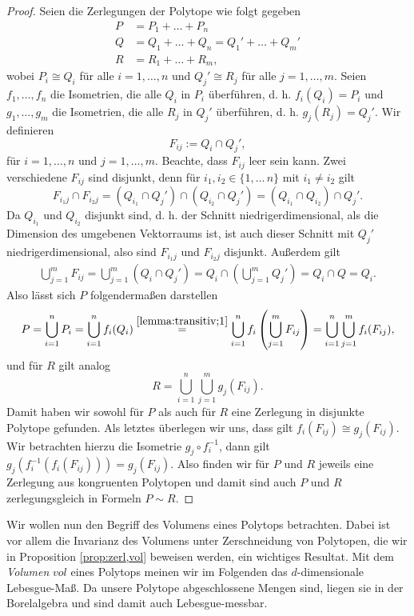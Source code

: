 \documentclass[11pt,titlepage]{article}
\theoremstyle{definition}
\theoremstyle{remark}
\begin{document}
	\begin{proof}
		Seien die Zerlegungen der Polytope wie folgt gegeben
		\begin{align*}
		P &= P_1+\ldots+P_n \\
		Q &= Q_1+\ldots+Q_n = Q_1'+\ldots+Q_m' \\
		R &= R_1+\ldots+R_m,
		\end{align*}
		wobei $P_i\cong Q_i$ für alle $i=1,\ldots,n$ und $Q_j'\cong R_j$ für alle $j=1,\ldots,m$. 
		Seien $f_1,\ldots,f_n$ die Isometrien, die alle $Q_i$ in $P_i$ überführen, 
		d. h. $f_i(Q_i)=P_i$ und 
		$g_1,\ldots,g_m$ die Isometrien, die alle $R_j$ in $Q_j'$ überführen, d. h. $g_j(R_j)=Q_j'$.
		Wir definieren
		\[ F_{ij}:=Q_i\cap Q_j',\]
		für $i=1,\ldots,n$ und $j=1,\ldots,m$. Beachte, dass $F_{ij}$ leer sein kann. Zwei verschiedene 
		$F_{ij}$ sind disjunkt, denn für $i_1,i_2\in\{1,\ldots\,n\}$ mit $i_1\neq i_2$ gilt 
		\[F_{i_1 j}\cap F_{i_2 j}=(Q_{i_1}\cap Q_j')\cap(Q_{i_2}\cap Q_j')=(Q_{i_1}\cap Q_{i_2})\cap Q_j'.\] 
		Da $Q_{i_1}$ und $Q_{i_2}$ disjunkt sind, d. h. der Schnitt niedrigerdimensional, als die Dimension des umgebenen Vektorraums ist, ist 
		auch dieser Schnitt mit $Q_j'$ niedrigerdimensional, also sind $F_{i_1j}$ und $F_{i_2j}$ disjunkt. Außerdem gilt
		\begin{align}
		\bigcup_{j=1}^m F_{ij} = \bigcup_{j=1}^m \left( Q_i \cap Q_j' \right) = 
		Q_i \cap \left( \bigcup_{j=1}^m Q_j' \right)=Q_i \cap Q = Q_i. \label{lemma:transitiv;1}
		\end{align}
		Also lässt sich $P$ folgendermaßen darstellen
		\[ P=\bigcup_{i=1}^n P_i = \bigcup_{i=1}^n f_i(Q_i) \overset{\ref{lemma:transitiv;1}}{=}\bigcup_{i=1}^n f_i 
		\left(\bigcup_{j=1}^m F_{ij} \right) =
		\bigcup_{i=1}^n \bigcup_{j=1}^m f_i(F_{ij}), \]
		und für $R$ gilt analog
		\[ R=\bigcup_{i=1}^n \bigcup_{j=1}^m g_j(F_{ij}). \]
		Damit haben wir sowohl für $P$ als auch für $R$ eine Zerlegung in 
		disjunkte Polytope gefunden. Als letztes überlegen wir uns, 
		dass gilt $f_i(F_{ij})\cong g_j(F_{ij})$. Wir betrachten hierzu die 
		Isometrie $g_j\circ f_i^{-1}$, dann gilt 
		$g_j(f_i^{-1}(f_i(F_{ij})))=g_j(F_{ij})$. Also finden wir für $P$ und 
		$R$ jeweils eine Zerlegung aus kongruenten Polytopen und damit sind 
		auch $P$ und $R$ zerlegungsgleich in Formeln $P\sim R$.
	\end{proof}
	
	Wir wollen nun den Begriff des Volumens eines Polytops betrachten. Dabei ist 
	vor allem die Invarianz des Volumens unter Zerschneidung von Polytopen, die wir in Proposition \ref{prop:zerl,vol} beweisen werden, ein wichtiges Resultat. Mit dem \textsl{Volumen} $vol$ eines Polytops meinen wir im Folgenden das 
	$d$-dimensionale Lebesgue-Maß. Da unsere Polytope abgeschlossene Mengen 
	sind, liegen sie in der Borelalgebra und sind damit auch Lebesgue-messbar.
	
\end{document}
